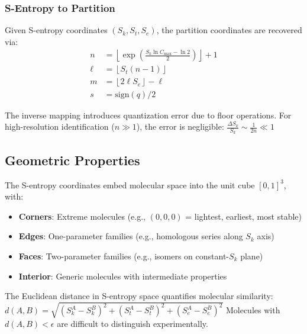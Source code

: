 \subsubsection{S-Entropy to Partition}

Given S-entropy coordinates $(S_k, S_t, S_e)$, the partition coordinates are recovered via:
\begin{align}
n &= \left\lfloor \exp\left(\frac{S_k \ln C_{\max} - \ln 2}{2}\right) \right\rfloor + 1 \\
\ell &= \left\lfloor S_t (n-1) \right\rfloor \\
m &= \left\lfloor 2\ell S_e \right\rfloor - \ell \\
s &= \text{sign}(q)/2
\end{align}

\begin{remark}
The inverse mapping introduces quantization error due to floor operations. For high-resolution identification ($n \gg 1$), the error is negligible:
$
\frac{\Delta S_k}{S_k} \sim \frac{1}{2n} \ll 1
$
\end{remark}

\subsection{Geometric Properties}

\begin{proposition}
\label{prop:unitcube}
The S-entropy coordinates embed molecular space into the unit cube $[0,1]^3$, with:
\begin{itemize}
    \item \textbf{Corners}: Extreme molecules (e.g., $(0,0,0)$ = lightest, earliest, most stable)
    \item \textbf{Edges}: One-parameter families (e.g., homologous series along $S_k$ axis)
    \item \textbf{Faces}: Two-parameter families (e.g., isomers on constant-$S_k$ plane)
    \item \textbf{Interior}: Generic molecules with intermediate properties
\end{itemize}
\end{proposition}

\begin{proposition}
\label{prop:metric}
The Euclidean distance in S-entropy space quantifies molecular similarity:
$
d(A, B) = \sqrt{(S_k^A - S_k^B)^2 + (S_t^A - S_t^B)^2 + (S_e^A - S_e^B)^2}
$
Molecules with $d(A, B) < \epsilon$ are difficult to distinguish experimentally.
\end{proposition}

